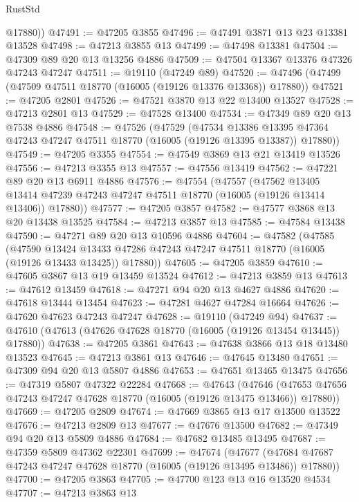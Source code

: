 \begin{lexlean}{RustStd}
\begin{coremodule}
        @17880))
@47491 := @47205 @3855
@47496 := @47491 @3871 @13 @23 @13381 @13528
@47498 := @47213 @3855 @13
@47499 := @47498 @13381
@47504 := @47309 @89 @20 @13 @13256 @4886
@47509 := @47504 @13367 @13376 @47326 @47243 @47247
@47511 := @19110 (@47249 @89)
@47520 := @47496 (@47499 (@47509 @47511 @18770 (@16005 (@19126 @13376 @13368)) @17880))
@47521 := @47205 @2801
@47526 := @47521 @3870 @13 @22 @13400 @13527
@47528 := @47213 @2801 @13
@47529 := @47528 @13400
@47534 := @47349 @89 @20 @13 @7538 @4886
@47548 := @47526
    (@47529
      (@47534
        @13386
        @13395
        @47364
        @47243
        @47247
        @47511
        @18770
        (@16005 (@19126 @13395 @13387))
        @17880))
@47549 := @47205 @3355
@47554 := @47549 @3869 @13 @21 @13419 @13526
@47556 := @47213 @3355 @13
@47557 := @47556 @13419
@47562 := @47221 @89 @20 @13 @6911 @4886
@47576 := @47554
    (@47557
      (@47562
        @13405
        @13414
        @47239
        @47243
        @47247
        @47511
        @18770
        (@16005 (@19126 @13414 @13406))
        @17880))
@47577 := @47205 @3857
@47582 := @47577 @3868 @13 @20 @13438 @13525
@47584 := @47213 @3857 @13
@47585 := @47584 @13438
@47590 := @47271 @89 @20 @13 @10596 @4886
@47604 := @47582
    (@47585
      (@47590
        @13424
        @13433
        @47286
        @47243
        @47247
        @47511
        @18770
        (@16005 (@19126 @13433 @13425))
        @17880))
@47605 := @47205 @3859
@47610 := @47605 @3867 @13 @19 @13459 @13524
@47612 := @47213 @3859 @13
@47613 := @47612 @13459
@47618 := @47271 @94 @20 @13 @4627 @4886
@47620 := @47618 @13444 @13454
@47623 := @47281 @4627 @47284 @16664
@47626 := @47620 @47623 @47243 @47247
@47628 := @19110 (@47249 @94)
@47637 := @47610 (@47613 (@47626 @47628 @18770 (@16005 (@19126 @13454 @13445)) @17880))
@47638 := @47205 @3861
@47643 := @47638 @3866 @13 @18 @13480 @13523
@47645 := @47213 @3861 @13
@47646 := @47645 @13480
@47651 := @47309 @94 @20 @13 @5807 @4886
@47653 := @47651 @13465 @13475
@47656 := @47319 @5807 @47322 @22284
@47668 := @47643
    (@47646 (@47653 @47656 @47243 @47247 @47628 @18770 (@16005 (@19126 @13475 @13466)) @17880))
@47669 := @47205 @2809
@47674 := @47669 @3865 @13 @17 @13500 @13522
@47676 := @47213 @2809 @13
@47677 := @47676 @13500
@47682 := @47349 @94 @20 @13 @5809 @4886
@47684 := @47682 @13485 @13495
@47687 := @47359 @5809 @47362 @22301
@47699 := @47674
    (@47677 (@47684 @47687 @47243 @47247 @47628 @18770 (@16005 (@19126 @13495 @13486)) @17880))
@47700 := @47205 @3863
@47705 := @47700 @123 @13 @16 @13520 @4534
@47707 := @47213 @3863 @13

\end{coremodule}
\end{lexlean}
